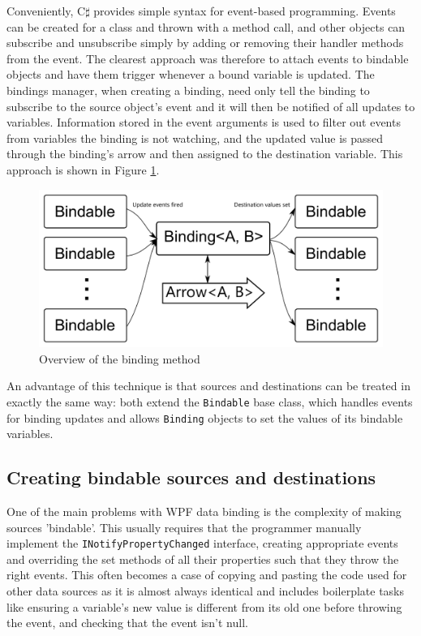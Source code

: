 \documentclass[12pt,twoside,notitlepage]{report}
\begin{document}
Conveniently, C$\sharp$ provides simple syntax for event-based programming. Events can be created for a class and thrown with a method call, and other objects can subscribe and unsubscribe simply by adding or removing their handler methods from the event. The clearest approach was therefore to attach events to bindable objects and have them trigger whenever a bound variable is updated. The bindings manager, when creating a binding, need only tell the binding to subscribe to the source object's event and it will then be notified of all updates to variables. Information stored in the event arguments is used to filter out events from variables the binding is not watching, and the updated value is passed through the binding's arrow and then assigned to the destination variable. This approach is shown in Figure \ref{fig:binding_framework}.

\begin{figure}[!ht]
  \centering
  \includegraphics[width=\textwidth]{fig/BindingFramework.pdf}
  \caption{Overview of the binding method}
  \label{fig:binding_framework}
\end{figure}

An advantage of this technique is that sources and destinations can be treated in exactly the same way: both extend the \texttt{Bindable} base class, which handles events for binding updates and allows \texttt{Binding} objects to set the values of its bindable variables.

\subsection{Creating bindable sources and destinations}

One of the main problems with WPF data binding is the complexity of making sources 'bindable'. This usually requires that the programmer manually implement the \texttt{INotifyPropertyChanged} interface, creating appropriate events and overriding the set methods of all their properties such that they throw the right events. This often becomes a case of copying and pasting the code used for other data sources as it is almost always identical and includes boilerplate tasks like ensuring a variable's new value is different from its old one before throwing the event, and checking that the event isn't null.
\end{document}
